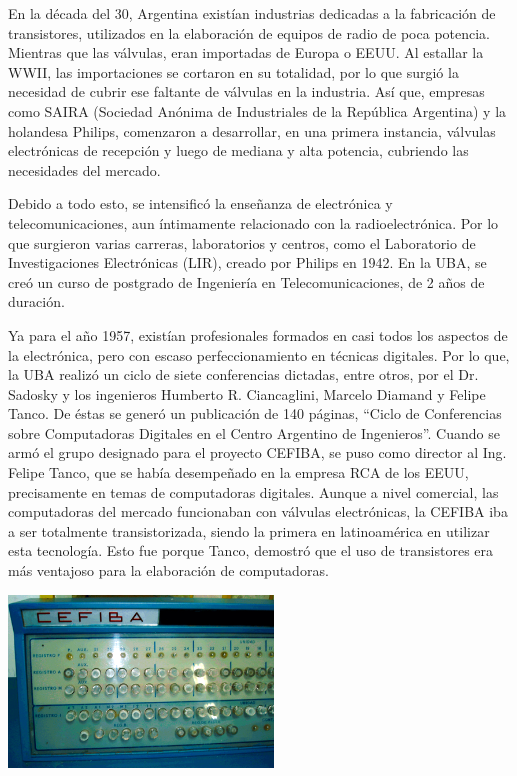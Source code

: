 \documentclass[%
  	final,
%
	notitlepage,
	narroweqnarray,
	inline,
 	twoside,
	]{ieee}
\begin{document}
En la d\'ecada del 30, Argentina exist\'ian industrias dedicadas a la fabricaci\'on de transistores, utilizados en la elaboraci\'on de equipos de radio de poca potencia. Mientras que las v\'alvulas, eran importadas de Europa o EEUU. Al estallar la WWII, las importaciones se cortaron en su totalidad, por lo que surgi\'o la necesidad de cubrir ese faltante de v\'alvulas en la industria. As\'i que, empresas como SAIRA (Sociedad An\'onima de Industriales de la Rep\'ublica Argentina) y la holandesa Philips, comenzaron a desarrollar, en una primera instancia, v\'alvulas electr\'onicas de recepci\'on y luego de mediana y alta potencia, cubriendo las necesidades del mercado.

Debido a todo esto, se intensific\'o la ense\~nanza de electr\'onica y telecomunicaciones, aun \'intimamente relacionado con la radioelectr\'onica. Por lo que surgieron varias carreras, laboratorios y centros, como el Laboratorio de Investigaciones Electr\'onicas (LIR), creado por Philips en 1942. En la UBA, se cre\'o un curso de postgrado de Ingenier\'ia en Telecomunicaciones, de 2 a\~nos de duraci\'on.

Ya para el a\~no 1957, exist\'ian profesionales formados en casi todos los aspectos de la electr\'onica, pero con escaso perfeccionamiento en t\'ecnicas digitales. Por lo que, la UBA realiz\'o un ciclo de siete conferencias dictadas, entre otros, por el Dr. Sadosky y los ingenieros Humberto R. Ciancaglini, Marcelo Diamand y Felipe Tanco. De \'estas se gener\'o un publicaci\'on de 140 p\'aginas, ``Ciclo de Conferencias sobre Computadoras Digitales en el Centro Argentino de Ingenieros''.
Cuando se arm\'o el grupo designado para el proyecto CEFIBA, se puso como director al Ing. Felipe Tanco, que se hab\'ia desempe\~nado en la empresa RCA de los EEUU, precisamente en temas de computadoras digitales. Aunque a nivel comercial, las computadoras del mercado funcionaban con v\'alvulas electr\'onicas, la CEFIBA iba a ser totalmente transistorizada, siendo la primera en latinoam\'erica en utilizar esta tecnolog\'ia. Esto fue porque Tanco, demostr\'o que el uso de transistores era m\'as ventajoso para la elaboraci\'on de computadoras.\\

\begin{center}\includegraphics[width=200pt, height=130pt]{cefiba.png}\end{center}
\end{document}
